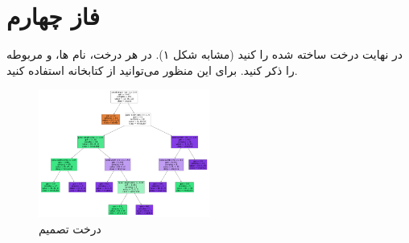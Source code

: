 \documentclass{article}
\begin{document}
	\section{فاز چهارم}
	در نهایت درخت ساخته شده را  کنید (مشابه شکل ۱). در هر  درخت، نام  ها،   و  مربوطه را ذکر کنید. برای این منظور می‌توانید از کتابخانه   استفاده کنید.
	\begin{figure}
		\centerline{\includegraphics[width=0.5\textwidth]{dt-digram.png}}
		\caption{درخت تصمیم}
		\label{fig}
	\end{figure}
	 
	
\end{document}
